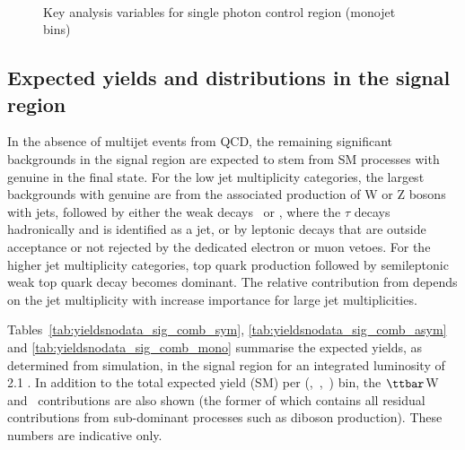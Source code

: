\begin{figure}
\begin{center}
         \\
        \caption{Key analysis variables for single photon control region (monojet bins)}
        \label{fig:distribution_singlephoton_mono}
    \end{center}
\end{figure}

\clearpage
\subsection{Expected yields and distributions in the signal region}

In the absence of multijet events from QCD, the remaining significant
backgrounds in the signal region are expected to stem from SM
processes with genuine \met in the final state. For the low jet
multiplicity categories, the largest backgrounds with genuine \met are
from the associated production of W or Z bosons with jets, followed by
either the weak decays \znunu\ or \wtaunu, where the $\tau$ decays
hadronically and is identified as a jet, or by leptonic decays that
are outside acceptance or not rejected by the dedicated electron or
muon vetoes. For the higher jet multiplicity categories, top quark
production followed by semileptonic weak top quark decay becomes
dominant. The relative contribution from \ttbar depends on the jet
multiplicity with increase importance for large jet multiplicities.

Tables~\ref{tab:yieldsnodata_sig_comb_sym},
\ref{tab:yieldsnodata_sig_comb_asym} and \ref{tab:yieldsnodata_sig_comb_mono} 
summarise the expected yields, as
determined from simulation, in the signal region for an integrated
luminosity of 2.1 \ifb. In addition to the total expected yield (SM)
per (\njet,~\nb,~\scalht) bin, the $\ttbar$W and \znunu\ contributions
are also shown (the former of which contains all residual
contributions from sub-dominant processes such as \eg diboson
production). These numbers are indicative only.

